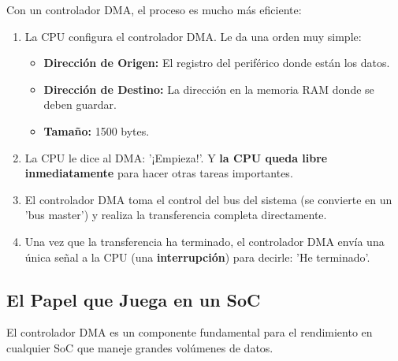 \documentclass[12pt,a4paper]{article}
\begin{document}
Con un controlador DMA, el proceso es mucho más eficiente:
\begin{enumerate}
    \item La CPU configura el controlador DMA. Le da una orden muy simple:
    \begin{itemize}
        \item \textbf{Dirección de Origen:} El registro del periférico donde están los datos.
        \item \textbf{Dirección de Destino:} La dirección en la memoria RAM donde se deben guardar.
        \item \textbf{Tamaño:} 1500 bytes.
    \end{itemize}
    \item La CPU le dice al DMA: '¡Empieza!'. Y \textbf{la CPU queda libre inmediatamente} para hacer otras tareas importantes.
    \item El controlador DMA toma el control del bus del sistema (se convierte en un 'bus master') y realiza la transferencia completa directamente.
    \item Una vez que la transferencia ha terminado, el controlador DMA envía una única señal a la CPU (una \textbf{interrupción}) para decirle: 'He terminado'.
\end{enumerate}

\subsection{El Papel que Juega en un SoC}

El controlador DMA es un componente fundamental para el rendimiento en cualquier SoC que maneje grandes volúmenes de datos.
\end{document}
